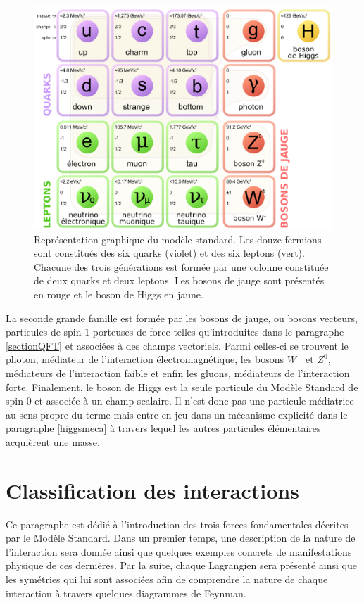     \begin{figure}
    \centering
        \includegraphics[scale=0.22]{Chapitre2/Images/MS.png} 
        \caption{Représentation graphique du modèle standard. Les douze fermions sont constitués des six quarks (violet) et des six leptons (vert). Chacune des trois générations est formée par une colonne constituée de deux quarks et deux leptons. Les bosons de jauge sont présentés en rouge et le boson de Higgs en jaune.}
    \label{MS}
    \end{figure}

    La seconde grande famille est formée par les bosons de jauge, ou bosons vecteurs, particules de spin $1$ porteuses de force telles qu'introduites dans le paragraphe \ref{sectionQFT} et associées à des champs vectoriels. Parmi celles-ci se trouvent le photon, médiateur de l'interaction électromagnétique, les bosons $W^{\pm}$ et $Z^0$, médiateurs de l'interaction faible et enfin les gluons, médiateurs de l'interaction forte. Finalement, le boson de Higgs est la seule particule du Modèle Standard de spin $0$ et associée à un champ scalaire. Il n'est donc pas une particule médiatrice au sens propre du terme mais entre en jeu dans un mécanisme explicité dans le paragraphe \ref{higgsmeca} à travers lequel les autres particules élémentaires acquièrent une masse. 
    
    \section{Classification des interactions}

    Ce paragraphe est dédié à l'introduction des trois forces fondamentales décrites par le Modèle Standard. Dans un premier temps, une description de la nature de l'interaction sera donnée ainsi que quelques exemples concrets de manifestations physique de ces dernières. Par la suite, chaque Lagrangien sera présenté ainsi que les symétries qui lui sont associées afin de comprendre la nature de chaque interaction à travers quelques diagrammes de Feynman.

